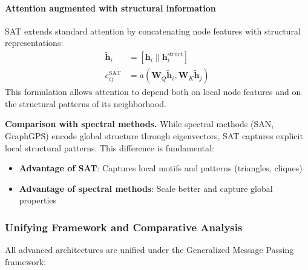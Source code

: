 \paragraph{Attention augmented with structural information}

\begin{definition}\label{def:sat_attention}
SAT extends standard attention by concatenating node features with structural representations:
\begin{align}
    \tilde{\mathbf{h}}_i &= [\mathbf{h}_i \| \mathbf{h}_i^{\text{struct}}] \label{eq:sat_augmented_features} \\
    e_{ij}^{\text{SAT}} &= a\left(\mathbf{W}_Q \tilde{\mathbf{h}}_i, \mathbf{W}_K \tilde{\mathbf{h}}_j\right) \label{eq:sat_attention_score}
\end{align}
This formulation allows attention to depend both on local node features and on the structural patterns of its neighborhood.
\end{definition}

\textbf{Comparison with spectral methods.}\label{rem:sat_vs_spectral} While spectral methods (SAN, GraphGPS) encode global structure through eigenvectors, SAT captures explicit local structural patterns. This difference is fundamental:
\begin{itemize}
    \item \textbf{Advantage of SAT}: Captures local motifs and patterns (triangles, cliques)
    \item \textbf{Advantage of spectral methods}: Scale better and capture global properties
\end{itemize}

\subsubsection{Unifying Framework and Comparative Analysis}\label{subsubsec:unified_framework_advanced}

All advanced architectures are unified under the Generalized Message Passing framework:

